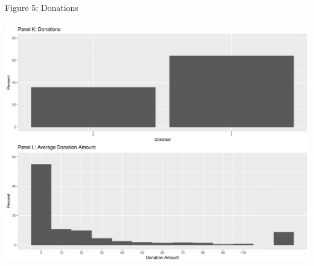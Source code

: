 \documentclass[12pt]{article}
\begin{document}
\noindent Figure 5: Donations\\ \\
\includegraphics[scale=0.4]{Figure4.pdf}\\ \\
\end{document}
